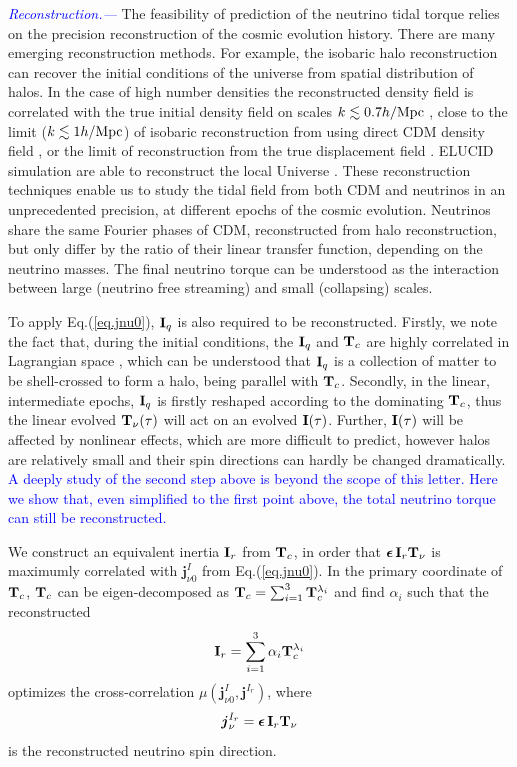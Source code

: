 \documentclass[aps,prd,twocolumn,amsmath,amssymb,amsfont,superscriptaddress]{revtex4-1}
\newcommand{\bs}{\boldsymbol}
\newcommand{\T}{\bold{T}}
\newcommand{\I}{\bold{I}}
\newcommand{\spin}{\bs{j}}
\newcommand{\tcb}{\textcolor{blue}}
\begin{document}
\tcb{\textit{Reconstruction.---}} 
The feasibility of prediction of the neutrino tidal torque relies on the precision reconstruction of the cosmic evolution history. 
There are many emerging reconstruction methods. 
For example, the isobaric halo reconstruction can recover the initial conditions of the universe from spatial distribution of halos. 
In the case of high number densities the reconstructed density field is correlated with the true initial density field on scales $k\lesssim 0.7 h/{\rm Mpc}$ \citep{2017ApJ...847..110Y}, 
close to the limit ($k\lesssim 1 h/{\rm Mpc}$) of isobaric reconstruction from using direct CDM density field \citep{2017PhRvD..96l3502Z}, 
or the limit of reconstruction from the true displacement field \citep{2017PhRvD..95d3501Y}. 
ELUCID simulation are able to reconstruct the local Universe \citep{2014ApJ...794...94W}.
These reconstruction techniques enable us to study the tidal field from both CDM and neutrinos in an unprecedented precision, at different epochs of the cosmic evolution. 
Neutrinos share the same Fourier phases of CDM, reconstructed from halo reconstruction, but only differ by the ratio of their linear transfer function, depending on the neutrino masses.
The final neutrino torque can be understood as the interaction between large (neutrino free streaming) and small (collapsing) scales.

To apply Eq.(\ref{eq.jnu0}), $\I_q$ is also required to be reconstructed. 
Firstly, we note the fact that, during the initial conditions, the $\I_q$ and $\T_c$ are highly correlated in Lagrangian space \citep{2000ApJ...532L...5L,2001ApJ...555..106L}, 
which can be understood that $\I_q$ is a collection of matter to be shell-crossed to form a halo, being parallel with $\T_c$.
Secondly, in the linear, intermediate epochs, $\I_q$ is firstly reshaped according to the dominating $\T_c$, thus the linear evolved $\T_\nu(\tau)$ will act on an evolved $\I(\tau)$.
Further, $\I(\tau)$ will be affected by nonlinear effects, which are more difficult to predict, however halos are relatively small and their spin directions can hardly be changed dramatically.
\tcb{A deeply study of the second step above is beyond the scope of this letter. Here we show that, even simplified to the first point above, the total neutrino torque can still be reconstructed.}

We construct an equivalent inertia $\I_r$ from $\T_c$, in order that $\bs{\epsilon}\,\I_r\T_\nu$ is maximumly correlated with $\spin^I_{\nu 0}$ from Eq.(\ref{eq.jnu0}).
In the primary coordinate of $\T_c$, $\T_c$ can be eigen-decomposed as $\T_c=\sum_{i=1}^3\T^{\lambda_i}_c$ and find $\alpha_i$ such that the reconstructed
\begin{equation}\label{eq.Ir}
	\I_r=\sum_{i=1}^3\alpha_i\T^{\lambda_i}_c
\end{equation}
optimizes the cross-correlation $\mu(\spin^I_{\nu 0},\spin^{I_r})$, where
\begin{equation}\label{eq.jnuIr}
 	\spin^{I_r}_\nu=\bs{\epsilon}\,\I_r\T_\nu
\end{equation}
is the reconstructed neutrino spin direction.
\end{document}
